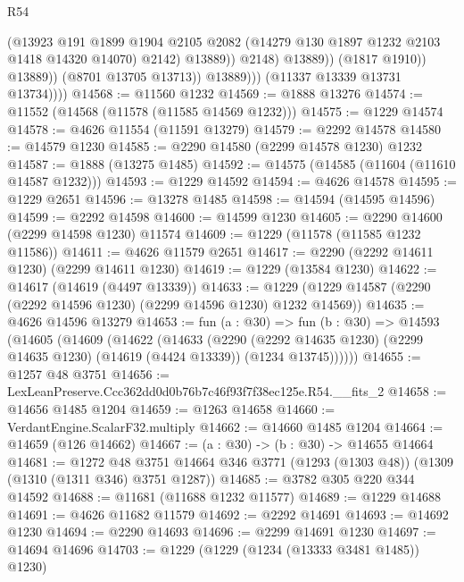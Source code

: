 \begin{lexlean}{R54}
\begin{coremodule}
                                  (@13923
                                    @191
                                    @1899
                                    @1904
                                    @2105
                                    @2082
                                    (@14279 @130 @1897 @1232 @2103 @1418 @14320 @14070)
                                    @2142)
                                  @13889))
                              @2148)
                            @13889))
                        (@1817 @1910))
                      @13889))
                  (@8701 @13705 @13713))
                @13889)))
          (@11337 @13339 @13731 @13734))))
@14568 := @11560 @1232
@14569 := @1888 @13276
@14574 := @11552 (@14568 (@11578 (@11585 @14569 @1232)))
@14575 := @1229 @14574
@14578 := @4626 @11554 (@11591 @13279)
@14579 := @2292 @14578
@14580 := @14579 @1230
@14585 := @2290 @14580 (@2299 @14578 @1230) @1232
@14587 := @1888 (@13275 @1485)
@14592 := @14575 (@14585 (@11604 (@11610 @14587 @1232)))
@14593 := @1229 @14592
@14594 := @4626 @14578
@14595 := @1229 @2651
@14596 := @13278 @1485
@14598 := @14594 (@14595 @14596)
@14599 := @2292 @14598
@14600 := @14599 @1230
@14605 := @2290 @14600 (@2299 @14598 @1230) @11574
@14609 := @1229 (@11578 (@11585 @1232 @11586))
@14611 := @4626 @11579 @2651
@14617 := @2290 (@2292 @14611 @1230) (@2299 @14611 @1230)
@14619 := @1229 (@13584 @1230)
@14622 := @14617 (@14619 (@4497 @13339))
@14633 := @1229 (@1229 @14587 (@2290 (@2292 @14596 @1230) (@2299 @14596 @1230) @1232 @14569))
@14635 := @4626 @14596 @13279
@14653 := fun (a : @30) =>
  fun (b : @30) =>
  @14593
    (@14605
      (@14609
        (@14622
          (@14633
            (@2290
              (@2292 @14635 @1230)
              (@2299 @14635 @1230)
              (@14619 (@4424 @13339))
              (@1234 @13745))))))
@14655 := @1257 @48 @3751
@14656 := LexLeanPreserve.Ccc362dd0d0b76b7c46f93f7f38ec125e.R54.__fits_2
@14658 := @14656 @1485 @1204
@14659 := @1263 @14658
@14660 := VerdantEngine.ScalarF32.multiply
@14662 := @14660 @1485 @1204
@14664 := @14659 (@126 @14662)
@14667 := (a : @30) -> (b : @30) -> @14655 @14664
@14681 := @1272
    @48
    @3751
    @14664
    @346
    @3771
    (@1293 (@1303 @48))
    (@1309 (@1310 (@1311 @346) @3751 @1287))
@14685 := @3782 @305 @220 @344 @14592
@14688 := @11681 (@11688 @1232 @11577)
@14689 := @1229 @14688
@14691 := @4626 @11682 @11579
@14692 := @2292 @14691
@14693 := @14692 @1230
@14694 := @2290 @14693
@14696 := @2299 @14691 @1230
@14697 := @14694 @14696
@14703 := @1229 (@1229 (@1234 (@13333 @3481 @1485)) @1230)

\end{coremodule}
\end{lexlean}
